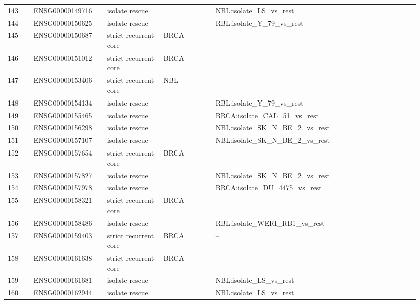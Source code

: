 \begin{landscape}
{\begin{longtable}{p{0.06\linewidth}p{0.17\linewidth}p{0.13\linewidth}p{0.12\linewidth}p{0.47\linewidth}}
143 & ENSG00000149716 & isolate rescue &  & NBL:isolate\_\allowbreak{}LS\_\allowbreak{}vs\_\allowbreak{}rest \\
144 & ENSG00000150625 & isolate rescue &  & RBL:isolate\_\allowbreak{}Y\_\allowbreak{}79\_\allowbreak{}vs\_\allowbreak{}rest \\
145 & ENSG00000150687 & strict recurrent core & BRCA & -- \\
146 & ENSG00000151012 & strict recurrent core & BRCA & -- \\
147 & ENSG00000153406 & strict recurrent core & NBL & -- \\
148 & ENSG00000154134 & isolate rescue &  & RBL:isolate\_\allowbreak{}Y\_\allowbreak{}79\_\allowbreak{}vs\_\allowbreak{}rest \\
149 & ENSG00000155465 & isolate rescue &  & BRCA:isolate\_\allowbreak{}CAL\_\allowbreak{}51\_\allowbreak{}vs\_\allowbreak{}rest \\
150 & ENSG00000156298 & isolate rescue &  & NBL:isolate\_\allowbreak{}SK\_\allowbreak{}N\_\allowbreak{}BE\_\allowbreak{}2\_\allowbreak{}vs\_\allowbreak{}rest \\
151 & ENSG00000157107 & isolate rescue &  & NBL:isolate\_\allowbreak{}SK\_\allowbreak{}N\_\allowbreak{}BE\_\allowbreak{}2\_\allowbreak{}vs\_\allowbreak{}rest \\
152 & ENSG00000157654 & strict recurrent core & BRCA & -- \\
153 & ENSG00000157827 & isolate rescue &  & NBL:isolate\_\allowbreak{}SK\_\allowbreak{}N\_\allowbreak{}BE\_\allowbreak{}2\_\allowbreak{}vs\_\allowbreak{}rest \\
154 & ENSG00000157978 & isolate rescue &  & BRCA:isolate\_\allowbreak{}DU\_\allowbreak{}4475\_\allowbreak{}vs\_\allowbreak{}rest \\
155 & ENSG00000158321 & strict recurrent core & BRCA & -- \\
156 & ENSG00000158486 & isolate rescue &  & RBL:isolate\_\allowbreak{}WERI\_\allowbreak{}RB1\_\allowbreak{}vs\_\allowbreak{}rest \\
157 & ENSG00000159403 & strict recurrent core & BRCA & -- \\
158 & ENSG00000161638 & strict recurrent core & BRCA & -- \\
159 & ENSG00000161681 & isolate rescue &  & NBL:isolate\_\allowbreak{}LS\_\allowbreak{}vs\_\allowbreak{}rest \\
160 & ENSG00000162944 & isolate rescue &  & NBL:isolate\_\allowbreak{}LS\_\allowbreak{}vs\_\allowbreak{}rest \\

\end{longtable}}
\end{landscape}
